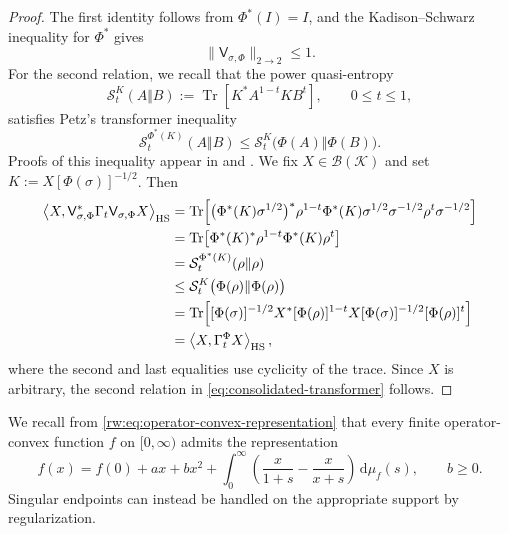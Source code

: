 \documentclass[11pt]{article}
\theoremstyle{remark}
\newcommand{\1}{\mathbbm{1}}
\begin{document}
\begin{proof}
The first identity follows from $\Phi^*(I)=I$, and the
Kadison--Schwarz inequality for $\Phi^*$
\cite{choi1974schwarz} gives
\begin{equation}
 \lVert\mathsf V_{\sigma,\Phi}\rVert_{2\to2}\leq1.
\end{equation}
For the second relation, we recall that the power quasi-entropy
\begin{equation*}
 \mathcal S_t^K(A\Vert B)
 :=\operatorname{Tr}\!\left[K^*A^{1-t}KB^t\right],
 \qquad 0\leq t\leq1,
\end{equation*}
satisfies Petz's transformer inequality
\begin{equation*}
 \mathcal S_t^{\Phi^*(K)}(A\Vert B)
 \leq \mathcal S_t^K\bigl(\Phi(A)\Vert\Phi(B)\bigr).
\end{equation*}
Proofs of this inequality appear in \cite[Theorem~4]{petz1986quasi} and
\cite[Section~3.6]{petz2007quantum}.
We fix $X\in\mathcal B(\mathcal K)$ and set
$K:=X[\Phi(\sigma)]^{-1/2}$.  Then
\begin{align*}
 \left\langle X,\mathsf V_{\sigma,\Phi}^*\Gamma_t
          \mathsf V_{\sigma,\Phi}X\right\rangle_{\rm HS}
 &=\operatorname{Tr}\!\left[
   \bigl(\Phi^*(K)\sigma^{1/2}\bigr)^*
   \rho^{1-t}\Phi^*(K)\sigma^{1/2}
   \sigma^{-1/2}\rho^t\sigma^{-1/2}\right]\\
 &=\operatorname{Tr}\!\left[\Phi^*(K)^*\rho^{1-t}
                    \Phi^*(K)\rho^t\right]\\
 &=\mathcal S_t^{\Phi^*(K)}(\rho\Vert\rho)\\
 &\leq\mathcal S_t^K\bigl(\Phi(\rho)\Vert\Phi(\rho)\bigr)\\
 &=\operatorname{Tr}\!\left[[\Phi(\sigma)]^{-1/2}X^*
      [\Phi(\rho)]^{1-t}X[\Phi(\sigma)]^{-1/2}
      [\Phi(\rho)]^t\right]\\
 &=\left\langle X,\Gamma_t^\Phi X\right\rangle_{\rm HS},
\end{align*}
where the second and last equalities use cyclicity of the trace.
Since $X$ is arbitrary, the second relation in
\eqref{eq:consolidated-transformer} follows.
\end{proof}

We recall from \eqref{rw:eq:operator-convex-representation} that every
finite operator-convex function $f$ on $[0,\infty)$ admits the
representation
\begin{equation}
 f(x)=f(0)+ax+bx^2+
 \int_0^\infty\left(
 \frac{x}{1+s}-\frac{x}{x+s}\right)\,\mathrm d\mu_f(s),
 \qquad b\geq0.
 \label{eq:consolidated-f-representation}
\end{equation}
Singular endpoints can instead be handled on the appropriate support
by regularization.
\end{document}
